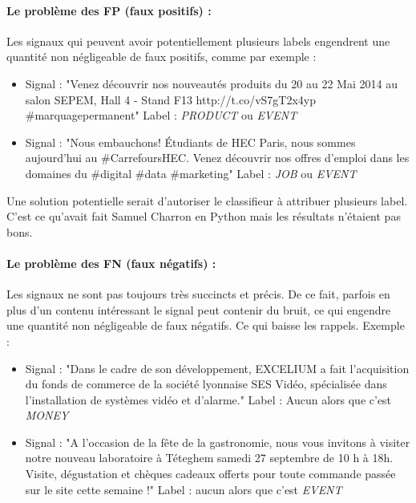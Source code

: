                 \paragraph{Le problème des FP (faux positifs) :}
                    Les signaux qui peuvent avoir potentiellement plusieurs labels engendrent une quantité non négligeable de faux positifs, comme par exemple :
                    \begin{itemize}
                        \item Signal : "Venez découvrir nos nouveautés produits du 20 au 22 Mai 2014 au salon SEPEM, Hall 4 - Stand F13 http://t.co/vS7gT2x4yp \#marquagepermanent" Label : \textit{PRODUCT} ou \textit{EVENT}
                        \item Signal : "Nous embauchons! Étudiants de HEC Paris, nous sommes aujourd'hui au \#CarrefoursHEC. Venez découvrir nos offres d'emploi dans les domaines du \#digital \#data \#marketing" Label : \textit{JOB} ou \textit{EVENT}
                    \end{itemize}
                    Une solution potentielle serait d'autoriser le classifieur à attribuer plusieurs label. C'est ce qu'avait fait Samuel Charron en Python mais les résultats n'étaient pas bons.

                \paragraph{Le problème des FN (faux négatifs) :}
                    Les signaux ne sont pas toujours très succincts et précis. De ce fait, parfois en plus d'un contenu intéressant le signal peut contenir du bruit, ce qui engendre une quantité non négligeable de faux négatifs. Ce qui baisse les rappels. Exemple :
                    \begin{itemize}
                        \item Signal : "Dans le cadre de son développement, EXCELIUM a fait l'acquisition du fonds de commerce de la société lyonnaise SES Vidéo, spécialisée dans l'installation de systèmes vidéo et d'alarme." Label : Aucun alors que c'est \textit{MONEY}
                        \item Signal : "A l'occasion de la fête de la gastronomie, nous vous invitons à visiter notre nouveau laboratoire à Téteghem samedi 27 septembre de 10 h à 18h. Visite, dégustation et chèques cadeaux offerts pour toute commande passée sur le site cette semaine !" Label : aucun alors que c'est \textit{EVENT}
                    \end{itemize}

